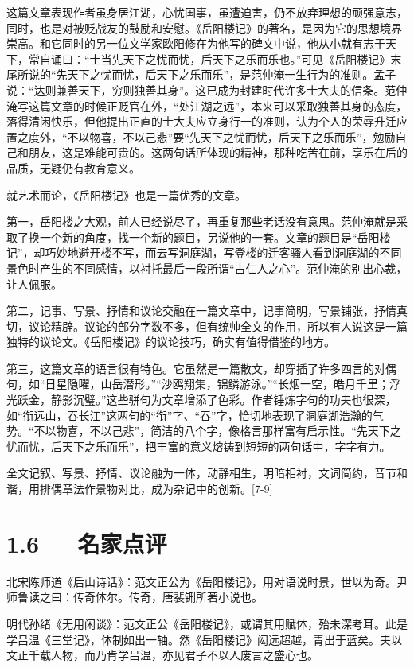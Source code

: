 \documentclass[letterpaper,12pt,english]{sphinxmanual}
\begin{document}
这篇文章表现作者虽身居江湖，心忧国事，虽遭迫害，仍不放弃理想的顽强意志，同时，也是对被贬战友的鼓励和安慰。《岳阳楼记》的著名，是因为它的思想境界崇高。和它同时的另一位文学家欧阳修在为他写的碑文中说，他从小就有志于天下，常自诵曰：“士当先天下之忧而忧，后天下之乐而乐也。”可见《岳阳楼记》末尾所说的“先天下之忧而忧，后天下之乐而乐”，是范仲淹一生行为的准则。孟子说：“达则兼善天下，穷则独善其身”。这已成为封建时代许多士大夫的信条。范仲淹写这篇文章的时候正贬官在外，“处江湖之远”，本来可以采取独善其身的态度，落得清闲快乐，但他提出正直的士大夫应立身行一的准则，认为个人的荣辱升迁应置之度外，“不以物喜，不以己悲”要“先天下之忧而忧，后天下之乐而乐”，勉励自己和朋友，这是难能可贵的。这两句话所体现的精神，那种吃苦在前，享乐在后的品质，无疑仍有教育意义。

就艺术而论，《岳阳楼记》也是一篇优秀的文章。

第一，岳阳楼之大观，前人已经说尽了，再重复那些老话没有意思。范仲淹就是采取了换一个新的角度，找一个新的题目，另说他的一套。文章的题目是“岳阳楼记”，却巧妙地避开楼不写，而去写洞庭湖，写登楼的迁客骚人看到洞庭湖的不同景色时产生的不同感情，以衬托最后一段所谓“古仁人之心”。范仲淹的别出心裁，让人佩服。

第二，记事、写景、抒情和议论交融在一篇文章中，记事简明，写景铺张，抒情真切，议论精辟。议论的部分字数不多，但有统帅全文的作用，所以有人说这是一篇独特的议论文。《岳阳楼记》的议论技巧，确实有值得借鉴的地方。

第三，这篇文章的语言很有特色。它虽然是一篇散文，却穿插了许多四言的对偶句，如“日星隐曜，山岳潜形。”“沙鸥翔集，锦鳞游泳。”“长烟一空，皓月千里；浮光跃金，静影沉璧。”这些骈句为文章增添了色彩。作者锤炼字句的功夫也很深，如“衔远山，吞长江”这两句的“衔”字、“吞”字，恰切地表现了洞庭湖浩瀚的气势。“不以物喜，不以己悲”，简洁的八个字，像格言那样富有启示性。“先天下之忧而忧，后天下之乐而乐”，把丰富的意义熔铸到短短的两句话中，字字有力。

全文记叙、写景、抒情、议论融为一体，动静相生，明暗相衬，文词简约，音节和谐，用排偶章法作景物对比，成为杂记中的创新。{[}7-9{]}


\section{1.6   名家点评}
\label{\detokenize{p01_u6563_u6587/_u8303_u4ef2_u6df9-_u5cb3_u9633_u697c_u8bb0:id8}}
北宋陈师道《后山诗话》：范文正公为《岳阳楼记》，用对语说时景，世以为奇。尹师鲁读之曰：传奇体尔。传奇，唐裴铏所著小说也。

明代孙绪《无用闲谈》：范文正公《岳阳楼记》，或谓其用赋体，殆未深考耳。此是学吕温《三堂记》，体制如出一轴。然《岳阳楼记》闳远超越，青出于蓝矣。夫以文正千载人物，而乃肯学吕温，亦见君子不以人废言之盛心也。
\end{document}
